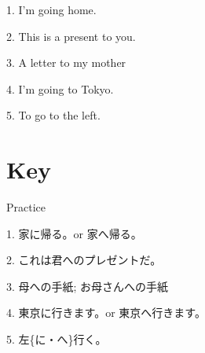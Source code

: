 \par{1. I'm going home. }
 
\par{2. This is a present to you. }
 
\par{3. A letter to my mother }
 
\par{4. I'm going to Tokyo. }
 
\par{5. To go to the left. }
      
\section{Key}
 
\par{Practice }

\par{1. 家に帰る。or 家へ帰る。 }

\par{2. これは君へのプレゼントだ。 }

\par{3. 母への手紙; お母さんへの手紙 }

\par{4. 東京に行きます。or 東京へ行きます。 }

\par{5. 左\{に・へ\}行く。 }
    